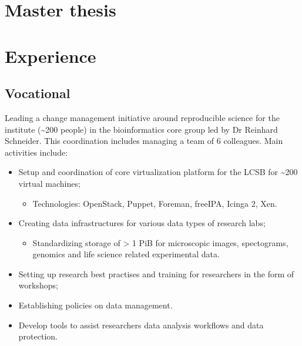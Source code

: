 \documentclass[11pt,a4paper,nolmodern, sans]{moderncv}        %
\begin{document}

\section{Master thesis}


\section{Experience}
\subsection{Vocational}


{Leading a change management initiative around reproducible science for the institute (\textasciitilde 200 people) in the bioinformatics core group led by Dr Reinhard Schneider. This coordination includes managing a team of 6 colleagues. \newline{} Main activities include:
\begin{itemize}
	\item Setup and coordination of core virtualization platform for the LCSB for \textasciitilde 200 virtual machines;
	\begin{itemize}
		\item Technologies: OpenStack, Puppet, Foreman, freeIPA, Icinga 2, Xen.
	\end{itemize}
	\item Creating data infrastructures for various data types of research labs;
  \begin{itemize}
		\item Standardizing storage of > 1 PiB for microscopic images, spectograms, genomics and life science related experimental data.
	\end{itemize}
	\item Setting up research best practises and training for researchers in the form of workshops;
	\item Establishing policies on data management.
	\item Develop tools to assist researchers data analysis workflows and data protection.
\end{itemize}}
\end{document}
